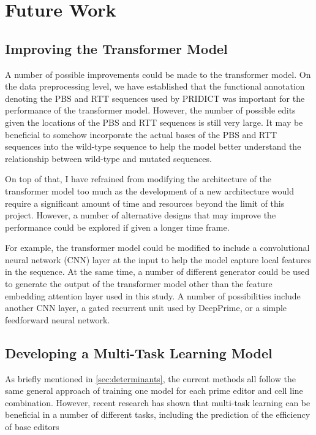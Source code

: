 \section{Future Work}

\subsection{Improving the Transformer Model}

A number of possible improvements could be made to the transformer model. On the data preprocessing level, we have established that the functional annotation denoting the PBS and RTT sequences used by PRIDICT was important for the performance of the transformer model. However, the number of possible edits given the locations of the PBS and RTT sequences is still very large. It may be beneficial to somehow incorporate the actual bases of the PBS and RTT sequences into the wild-type sequence to help the model better understand the relationship between wild-type and mutated sequences.

On top of that, I have refrained from modifying the architecture of the transformer model too much as the development of a new architecture would require a significant amount of time and resources beyond the limit of this project. However, a number of alternative designs that may improve the performance could be explored if given a longer time frame.

For example, the transformer model could be modified to include a convolutional neural network (CNN) layer at the input to help the model capture local features in the sequence. At the same time, a number of different generator could be used to generate the output of the transformer model other than the feature embedding attention layer used in this study. A number of possibilities include another CNN layer, a gated recurrent unit used by DeepPrime, or a simple feedforward neural network. 

\subsection{Developing a Multi-Task Learning Model}

As briefly mentioned in \autoref{sec:determinants}, the current methods all follow the same general approach of training one model for each prime editor and cell line combination. However, recent research has shown that multi-task learning can be beneficial in a number of different tasks, including the prediction of the efficiency of base editors\cite{mollaysaAttentionbasedMultitaskLearning2023a}

